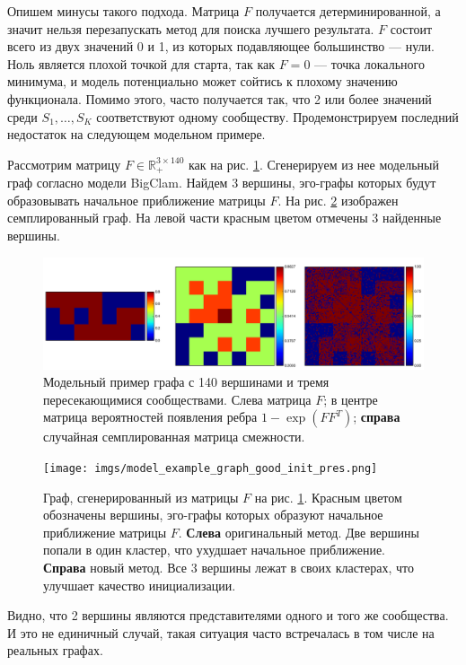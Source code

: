 \documentclass{ITaSconf}
\def\RR{\mathbb{R}}
\begin{document}
	Опишем минусы такого подхода. 
	Матрица $F$ получается детерминированной, а значит нельзя перезапускать метод для поиска лучшего результата.
	$F$ состоит всего из двух значений 0 и 1, из которых подавляющее большинство --- нули. 
	Ноль является плохой точкой для старта, так как $F=0$ --- точка локального минимума, и модель потенциально может сойтись к плохому значению функционала.
	Помимо этого, часто получается так, что 2 или более значений среди $S_1, \dots, S_K$ соответствуют одному сообществу. 
	Продемонстрируем последний недостаток на следующем модельном примере.
	
	Рассмотрим матрицу $F\in \RR_{+}^{3\times 140}$ как на рис. \ref{fig:model_ex}. 
	Сгенерируем из нее модельный граф согласно модели BigClam. 
	Найдем 3 вершины, эго-графы которых будут образовывать начальное приближение матрицы $F$. 
	На рис. \ref{fig:model_ex_graph} изображен семплированный граф. 
	На левой части красным цветом отмечены 3 найденные вершины.
	\begin{figure}[!ht]
		\centering
		\includegraphics[width=\linewidth]{imgs/model_example.png}
		\caption{Модельный пример графа с 140 вершинами и тремя пересекающимися сообществами. Слева матрица $F$; в центре матрица вероятностей появления ребра $1-\exp(FF^T)$; \textbf{справа} случайная семплированная матрица смежности.}
		\label{fig:model_ex}
	\end{figure}
	\begin{figure}[!ht]
		\centering
		\texttt{[image: imgs/model\_example\_graph\_good\_init\_pres.png]}
		\caption{Граф, сгенерированный из матрицы $F$ на рис. \ref{fig:model_ex}. Красным цветом обозначены вершины, эго-графы которых образуют начальное приближение матрицы $F$. \textbf{Слева} оригинальный метод. Две вершины попали в один кластер, что ухудшает начальное приближение. \textbf{Справа} новый метод. Все 3 вершины лежат в своих кластерах, что улучшает качество инициализации.}
		\label{fig:model_ex_graph}
	\end{figure}
	Видно, что 2 вершины являются представителями одного и того же сообщества. 
	И это не единичный случай, такая ситуация часто встречалась в том числе на реальных графах. 
	
\end{document}
